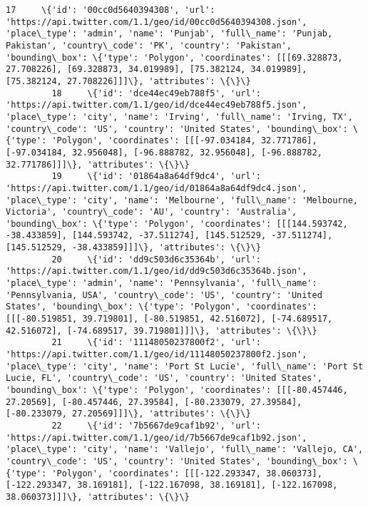 \documentclass[11pt]{article}
\begin{document}
\begin{Verbatim}[commandchars=\\\{\}]
         17     \{'id': '00cc0d5640394308', 'url': 'https://api.twitter.com/1.1/geo/id/00cc0d5640394308.json', 'place\_type': 'admin', 'name': 'Punjab', 'full\_name': 'Punjab, Pakistan', 'country\_code': 'PK', 'country': 'Pakistan', 'bounding\_box': \{'type': 'Polygon', 'coordinates': [[[69.328873, 27.708226], [69.328873, 34.019989], [75.382124, 34.019989], [75.382124, 27.708226]]]\}, 'attributes': \{\}\}                             
         18     \{'id': 'dce44ec49eb788f5', 'url': 'https://api.twitter.com/1.1/geo/id/dce44ec49eb788f5.json', 'place\_type': 'city', 'name': 'Irving', 'full\_name': 'Irving, TX', 'country\_code': 'US', 'country': 'United States', 'bounding\_box': \{'type': 'Polygon', 'coordinates': [[[-97.034184, 32.771786], [-97.034184, 32.956048], [-96.888782, 32.956048], [-96.888782, 32.771786]]]\}, 'attributes': \{\}\}                           
         19     \{'id': '01864a8a64df9dc4', 'url': 'https://api.twitter.com/1.1/geo/id/01864a8a64df9dc4.json', 'place\_type': 'city', 'name': 'Melbourne', 'full\_name': 'Melbourne, Victoria', 'country\_code': 'AU', 'country': 'Australia', 'bounding\_box': \{'type': 'Polygon', 'coordinates': [[[144.593742, -38.433859], [144.593742, -37.511274], [145.512529, -37.511274], [145.512529, -38.433859]]]\}, 'attributes': \{\}\}               
         20     \{'id': 'dd9c503d6c35364b', 'url': 'https://api.twitter.com/1.1/geo/id/dd9c503d6c35364b.json', 'place\_type': 'admin', 'name': 'Pennsylvania', 'full\_name': 'Pennsylvania, USA', 'country\_code': 'US', 'country': 'United States', 'bounding\_box': \{'type': 'Polygon', 'coordinates': [[[-80.519851, 39.719801], [-80.519851, 42.516072], [-74.689517, 42.516072], [-74.689517, 39.719801]]]\}, 'attributes': \{\}\}             
         21     \{'id': '11148050237800f2', 'url': 'https://api.twitter.com/1.1/geo/id/11148050237800f2.json', 'place\_type': 'city', 'name': 'Port St Lucie', 'full\_name': 'Port St Lucie, FL', 'country\_code': 'US', 'country': 'United States', 'bounding\_box': \{'type': 'Polygon', 'coordinates': [[[-80.457446, 27.20569], [-80.457446, 27.39584], [-80.233079, 27.39584], [-80.233079, 27.20569]]]\}, 'attributes': \{\}\}                 
         22     \{'id': '7b5667de9caf1b92', 'url': 'https://api.twitter.com/1.1/geo/id/7b5667de9caf1b92.json', 'place\_type': 'city', 'name': 'Vallejo', 'full\_name': 'Vallejo, CA', 'country\_code': 'US', 'country': 'United States', 'bounding\_box': \{'type': 'Polygon', 'coordinates': [[[-122.293347, 38.060373], [-122.293347, 38.169181], [-122.167098, 38.169181], [-122.167098, 38.060373]]]\}, 'attributes': \{\}\}                     

\end{Verbatim}
\end{document}
